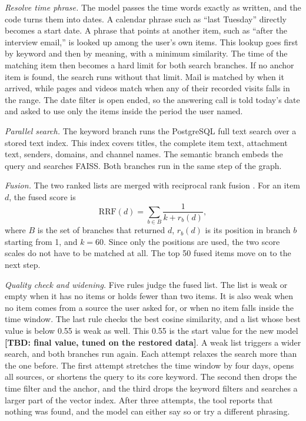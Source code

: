 \documentclass[conference]{IEEEtran}
\newcommand{\tbd}[1]{\textbf{[TBD: #1]}}
\begin{document}
\textit{Resolve time phrase.} The model passes the time words exactly as written, and the code turns them into dates. A calendar phrase such as ``last Tuesday'' directly becomes a start date. A phrase that points at another item, such as ``after the interview email,'' is looked up among the user's own items. This lookup goes first by keyword and then by meaning, with a minimum similarity. The time of the matching item then becomes a hard limit for both search branches. If no anchor item is found, the search runs without that limit. Mail is matched by when it arrived, while pages and videos match when any of their recorded visits falls in the range. The date filter is open ended, so the answering call is told today's date and asked to use only the items inside the period the user named.

\textit{Parallel search.} The keyword branch runs the PostgreSQL full text search over a stored text index. This index covers titles, the complete item text, attachment text, senders, domains, and channel names. The semantic branch embeds the query and searches FAISS. Both branches run in the same step of the graph.

\textit{Fusion.} The two ranked lists are merged with reciprocal rank fusion \cite{b9}. For an item $d$, the fused score is
\begin{equation}
\mathrm{RRF}(d) = \sum_{b \in B} \frac{1}{k + r_b(d)}, \label{eq:rrf}
\end{equation}
where $B$ is the set of branches that returned $d$, $r_b(d)$ is its position in branch $b$ starting from 1, and $k = 60$. Since only the positions are used, the two score scales do not have to be matched at all. The top 50 fused items move on to the next step.

\textit{Quality check and widening.} Five rules judge the fused list. The list is weak or empty when it has no items or holds fewer than two items. It is also weak when no item comes from a source the user asked for, or when no item falls inside the time window. The last rule checks the best cosine similarity, and a list whose best value is below 0.55 is weak as well. This 0.55 is the start value for the new model \tbd{final value, tuned on the restored data}. A weak list triggers a wider search, and both branches run again. Each attempt relaxes the search more than the one before. The first attempt stretches the time window by four days, opens all sources, or shortens the query to its core keyword. The second then drops the time filter and the anchor, and the third drops the keyword filters and searches a larger part of the vector index. After three attempts, the tool reports that nothing was found, and the model can either say so or try a different phrasing.
\end{document}
